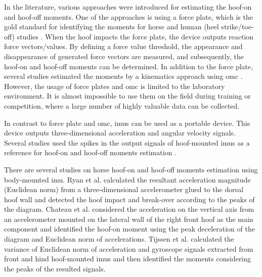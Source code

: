 In the literature, various approaches were introduced for estimating the hoof-on and hoof-off moments. One of the approaches is using a force plate, which is the gold standard for identifying the moments for horse and human (heel strike/toe-off) studies \cite{tijssen_2020_automatic,zahradka_2020_an}. When the hoof impacts the force plate, the device outputs reaction force vectors/values. By defining a force value threshold, the appearance and disappearance of generated force vectors are measured, and subsequently, the hoof-on and hoof-off moments can be determined. In addition to the force plate, several studies estimated the moments by a kinematics approach using \gls{omc} \cite{boye_2014_accuracy,roepstorff_2021_reliable, starke_2015_a}. However, the usage of force plates and \gls{omc} is limited to the laboratory environment. It is almost impossible to use them on the field during training or competition, where a large number of highly valuable data can be collected.

 
In contrast to force plate and \gls{omc}, \gls{imu}s can be used as a portable device. This device outputs three-dimensional acceleration and angular velocity signals. Several studies used the spikes in the output signals of hoof-mounted \gls{imu}s as a reference for hoof-on and hoof-off moments estimation \cite{tijssen_2020_automatic, barstow_2018_does, hernlund_2013_hoof, chateau_2009_effects, holdendouilly_2013_equine, ratzlaff_2005_relationships, alsaaod_2017_the, witte_2004_determination, starke_2012_accuracy, adsd1}. 

There are several studies on horse hoof-on and hoof-off moments estimation using body-mounted \gls{imu}. Ryan et al. \cite{ryan_2006_a} calculated the resultant acceleration magnitude (Euclidean norm) from a three-dimensional accelerometer glued to the dorsal hoof wall and detected the hoof impact and break-over according to the peaks of the diagram. Chateau et al. \cite{chateau_2009_effects,chateau_2010_biomechanical} considered the acceleration on the vertical axis from an accelerometer mounted on the lateral wall of the right front hoof as the main component and identified the hoof-on moment using the peak deceleration of the diagram and Euclidean norm of accelerations. Tijssen et al. \cite{tijssen_2020_automatic} calculated the variance of Euclidean norm of acceleration and gyroscope signals extracted from front and hind hoof-mounted \gls{imu}s and then identified the moments considering the peaks of the resulted signals. 

